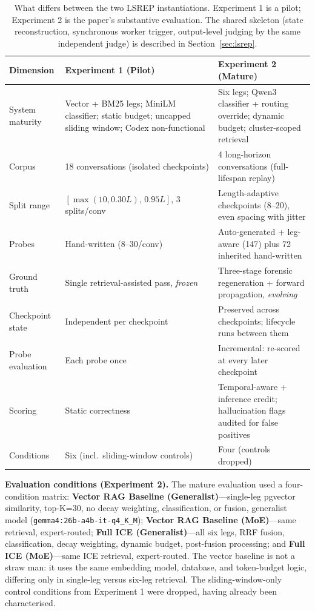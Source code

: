 \documentclass[10pt]{article}
\begin{document}
\begin{table}[htbp]
\centering
\small
\caption{What differs between the two LSREP instantiations. Experiment 1 is a pilot; Experiment 2 is the paper's substantive evaluation. The shared skeleton (state reconstruction, synchronous worker trigger, output-level judging by the same independent judge) is described in Section~\ref{sec:lsrep}.}
\label{tab:exp-diff}
\begin{tabular}{@{}L{3.3cm}L{5.0cm}L{5.0cm}@{}}
\toprule
\textbf{Dimension} & \textbf{Experiment 1 (Pilot)} & \textbf{Experiment 2 (Mature)} \\
\midrule
System maturity & Vector + BM25 legs; MiniLM classifier; static budget; uncapped sliding window; Codex non-functional & Six legs; Qwen3 classifier + routing override; dynamic budget; cluster-scoped retrieval \\
Corpus & 18 conversations (isolated checkpoints) & 4 long-horizon conversations (full-lifespan replay) \\
Split range & $[\max(10,0.30L),\,0.95L]$, 3 splits/conv & Length-adaptive checkpoints (8--20), even spacing with jitter \\
Probes & Hand-written (8--30/conv) & Auto-generated + leg-aware (147) plus 72 inherited hand-written \\
Ground truth & Single retrieval-assisted pass, \emph{frozen} & Three-stage forensic regeneration + forward propagation, \emph{evolving} \\
Checkpoint state & Independent per checkpoint & Preserved across checkpoints; lifecycle runs between them \\
Probe evaluation & Each probe once & Incremental: re-scored at every later checkpoint \\
Scoring & Static correctness & Temporal-aware + inference credit; hallucination flags audited for false positives \\
Conditions & Six (incl.\ sliding-window controls) & Four (controls dropped) \\
\bottomrule
\end{tabular}
\end{table}

\textbf{Evaluation conditions (Experiment 2).} The mature evaluation used a four-condition matrix: \textbf{Vector RAG Baseline (Generalist)}---single-leg pgvector similarity, top-K=30, no decay weighting, classification, or fusion, generalist model (\texttt{gemma4:26b-a4b-it-q4\_K\_M}); \textbf{Vector RAG Baseline (MoE)}---same retrieval, expert-routed; \textbf{Full ICE (Generalist)}---all six legs, RRF fusion, classification, decay weighting, dynamic budget, post-fusion processing; and \textbf{Full ICE (MoE)}---same ICE retrieval, expert-routed. The vector baseline is not a straw man: it uses the same embedding model, database, and token-budget logic, differing only in single-leg versus six-leg retrieval. The sliding-window-only control conditions from Experiment 1 were dropped, having already been characterised.
\end{document}
